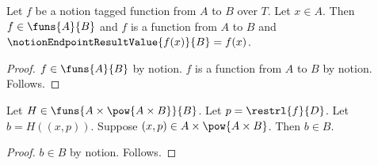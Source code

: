 \begin{proposition}\label{notion_endpoint_terminal_alias_chain}
    Let $f$ be a notion tagged function from $A$ to $B$ over $T$.
    Let $x\in A$.
    Then $f\in\funs{A}{B}$ and
        $f$ is a function from $A$ to $B$ and
        $\notionEndpointResultValue{f(x)}{B}=f(x)$.
\end{proposition}
\begin{proof}
    $f\in\funs{A}{B}$ by notion.
    $f$ is a function from $A$ to $B$ by notion.
    Follows.
\end{proof}

\begin{proposition}\label{notion_endpoint_aliased_product_result}
    Let $H\in\funs{A\times\pow{A\times B}}{B}$.
    Let $p=\restrl{f}{D}$.
    Let $b=H((x,p))$.
    Suppose $(x,p)\in A\times\pow{A\times B}$.
    Then $b\in B$.
\end{proposition}
\begin{proof}
    $b\in B$ by notion.
    Follows.
\end{proof}
